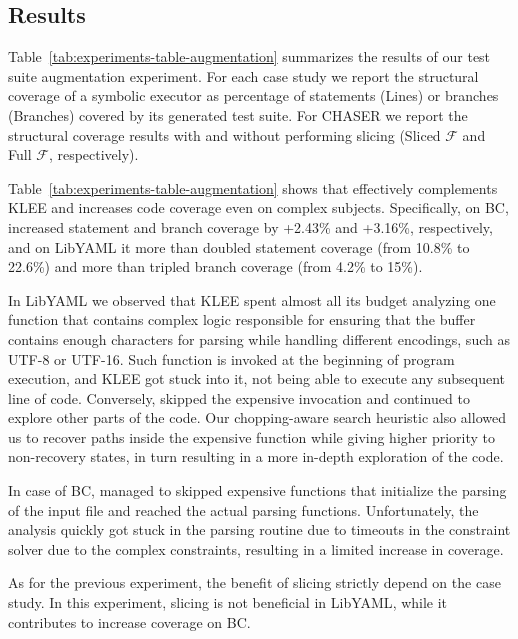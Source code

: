 \subsection{Results}
Table~\ref{tab:experiments-table-augmentation} summarizes the results
of our test suite augmentation experiment. For each case study we
report the structural coverage of a symbolic executor as percentage of
statements (Lines) or branches (Branches) covered by its generated
test suite. For CHASER we report the structural coverage results with
and without performing slicing (Sliced $\mathcal{F}$ and Full
$\mathcal{F}$, respectively).

Table~\ref{tab:experiments-table-augmentation} shows that \toolname
effectively complements KLEE and increases code coverage even on
complex subjects. Specifically, on \textsf{BC}, \toolname increased
statement and branch coverage by +2.43\% and +3.16\%, respectively,
and on \textsf{LibYAML} it more than doubled statement coverage (from
10.8\% to 22.6\%) and more than tripled branch coverage (from 4.2\% to
15\%).

In \textsf{LibYAML} we observed that KLEE spent almost all its budget
analyzing one function that contains complex logic responsible for
ensuring that the buffer contains enough characters for parsing while
handling different encodings, such as UTF-8 or UTF-16. Such function
is invoked at the beginning of program execution, and KLEE got stuck
into it, not being able to execute any subsequent line of
code. Conversely, \toolname skipped the expensive invocation and
continued to explore other parts of the code. Our chopping-aware
search heuristic also allowed us to recover paths inside the expensive
function while giving higher priority to non-recovery states, in turn
resulting in a more in-depth exploration of the code.

In case of \textsf{BC}, \toolname managed to skipped expensive
functions that initialize the parsing of the input file and reached
the actual parsing functions. Unfortunately, the analysis quickly got
stuck in the parsing routine due to timeouts in the constraint solver
due to the complex constraints, resulting in a limited increase in
coverage.

As for the previous experiment, the benefit of slicing strictly depend
on the case study. In this experiment, slicing is not beneficial in
\textsf{LibYAML}, while it contributes to increase coverage on
\textsf{BC}.



